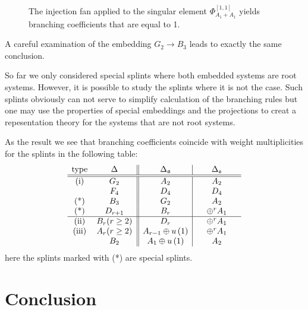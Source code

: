 \documentclass[12pt]{iopart}
\newcommand{\sfr}{\mathfrak{s}}
\begin{document}
\begin{figure}[h]
\begin{center}
\begin{minipage}[h]{0.47\linewidth}
\caption{The injection fan applied to the singular element $\Phi_{A_1+A_1}^{[1,1]}$ yields branching coefficients that are equal to 1.}
\label{ris2}
\end{minipage}
\end{center}
\end{figure}

A careful examination of the embedding $G_{2}\to B_{3}$ leads to exactly the same conclusion. 

So far we only considered special splints where both embedded systems are root systems. However, it
is possible to study the splints where it is not the case. Such splints obviously can not serve to
simplify calculation of the branching rules but one may use the properties of special embeddings and
the projections to creat a repesentation theory for the systems that are not root systems.

As the result we see that branching coefficients coincide with weight multiplicities for the splints
in the following table:
\begin{equation}
\label{tab:2}
\begin{array}{cc||c|c}
\hbox{type} & \hspace{0.25in}\Delta \hspace{0.25in} & \hspace{0.25in}\Delta
_{\frak{a}}\hspace{0.25in} & \hspace{0.25in}\Delta _{\sfr}\hspace{0.25in}
\\ \hline\hline
\hbox{(i)} & G_{2} & A_{2} & A_{2} \\
& F_{4} & D_{4} & D_{4} \\ 
\hbox{(*)} & B_{3} & G_{2} & A_{2}  \\
\hbox{(*)} & D_{r+1} & B_{r} & \oplus ^{r}A_{1}  \\
\hline
\hbox{(ii)} & B_{r}(r\geq 2) & D_{r} & \oplus ^{r}A_{1} \\
\hbox{(iii)} & A_{r}(r\geq 2) & A_{r-1}\oplus u\left( 1\right)  & \oplus
^{r}A_{1} \\
& B_{2} & A_{1}\oplus u\left( 1\right)  & A_{2}
\end{array}
\end{equation} 
here the splints marked with (*) are special splints.


\section*{Conclusion}
\label{sec:conclusion}
\end{document}
